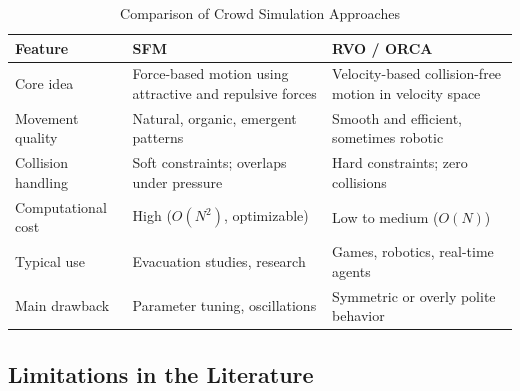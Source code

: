\documentclass[conference]{IEEEtran}
\begin{document}
\begin{table}[htbp]
    \centering
    \caption{Comparison of Crowd Simulation Approaches}
    \label{tab:method_comparison}
    \renewcommand{\arraystretch}{1.2}
    \begin{tabular}{p{2.2cm}p{2.1cm}p{2.1cm}}
        \toprule
        \textbf{Feature}                                         & \textbf{SFM} & \textbf{RVO / ORCA} \\
        \midrule
        Core idea                                                &
        Force-based motion using attractive and repulsive forces &
        Velocity-based collision-free motion in velocity space                                        \\
        Movement quality                                         &
        Natural, organic, emergent patterns                      &
        Smooth and efficient, sometimes robotic                                                       \\
        Collision handling                                       &
        Soft constraints; overlaps under pressure                &
        Hard constraints; zero collisions                                                             \\
        Computational cost                                       &
        High ($O(N^2)$, optimizable)                             &
        Low to medium ($O(N)$)                                                                        \\
        Typical use                                              &
        Evacuation studies, research                             &
        Games, robotics, real-time agents                                                             \\
        Main drawback                                            &
        Parameter tuning, oscillations                           &
        Symmetric or overly polite behavior                                                           \\
        \bottomrule
    \end{tabular}
\end{table}

\subsection{Limitations in the Literature}
\end{document}
